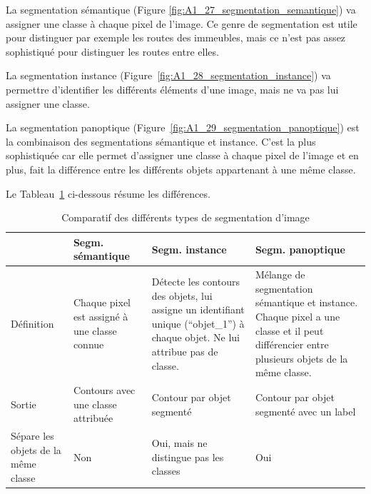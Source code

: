 La segmentation sémantique (Figure \ref{fig:A1_27_segmentation_semantique}) va assigner une classe à chaque pixel de l'image. Ce genre de segmentation est utile pour distinguer par exemple les routes des immeubles, mais ce n'est pas assez sophistiqué pour distinguer les routes entre elles.

La segmentation instance (Figure~\ref{fig:A1_28_segmentation_instance}) va permettre d'identifier les différents éléments d'une image, mais ne va pas lui assigner une classe.

La segmentation panoptique (Figure~\ref{fig:A1_29_segmentation_panoptique}) est la combinaison des segmentations sémantique et instance. C'est la plus sophistiquée car elle permet d'assigner une classe à chaque pixel de l'image et en plus, fait la différence entre les différents objets appartenant à une même classe.

Le Tableau~\ref{tab:comparatif_segmentation} ci-dessous résume les différences.

\begin{table}[H]
    \centering
    \begin{tabular}{|p{2cm}|p{3.75cm}|p{3.75cm}|p{3.75cm}|}
    \cline{2-4}
    \multicolumn{1}{c|}{} & \textbf{Segm. sémantique} & \textbf{Segm. instance} & \textbf{Segm. panoptique} \\
    \hline
    Définition & Chaque pixel est assigné à une classe connue & Détecte les contours des objets, lui assigne un identifiant unique (``objet\_1'') à chaque objet. Ne lui attribue pas de classe. & Mélange de segmentation sémantique et instance. Chaque pixel a une classe et il peut différencier entre plusieurs objets de la même classe. \\
    \hline
    Sortie & Contours avec une classe attribuée & Contour par objet segmenté & Contour par objet segmenté avec un label \\
    \hline
    Sépare les objets de la même classe & Non & Oui, mais ne distingue pas les classes & Oui \\
    \hline
    \end{tabular}
    \caption{Comparatif des différents types de segmentation d'image}
    \label{tab:comparatif_segmentation}
\end{table}

